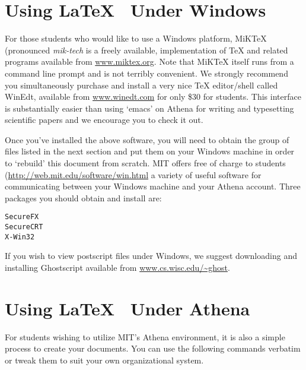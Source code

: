 \section{Using \LaTeX~ Under Windows}
For those students who would like to use a Windows platform, MiKTeX
(pronounced \emph{mik-tech} is a freely available, implementation of
TeX and related programs available from \url{www.miktex.org}. Note
that MiKTeX itself runs from a command line prompt and is not terribly
convenient.  We strongly recommend you simultaneously purchase and
install a very nice TeX editor/shell called WinEdt, available from
\url{www.winedt.com} for only \$30 for students. This interface is
substantially easier than using `emacs' on Athena for writing and
typesetting scientific papers and we encourage you to check it out.

Once you've installed the above software, you will need to obtain the
group of files listed in the next section and put them on your Windows
machine in order to `rebuild' this document from scratch.  MIT offers
free of charge to students (\url{http://web.mit.edu/software/win.html}
a variety of useful software for communicating between your Windows
machine and your Athena account.  Three packages you should obtain and
install are:
\begin{verbatim}
SecureFX
SecureCRT
X-Win32
\end{verbatim}

If you wish to view postscript files under Windows, we
suggest downloading and installing Ghostscript available from
\url{www.cs.wisc.edu/~ghost}.





\section{Using \LaTeX~ Under Athena}
For students wishing to utilize MIT's Athena environment, it is also
a simple process to create your documents.  You can use the following
commands verbatim or tweak them to suit your own organizational system.

